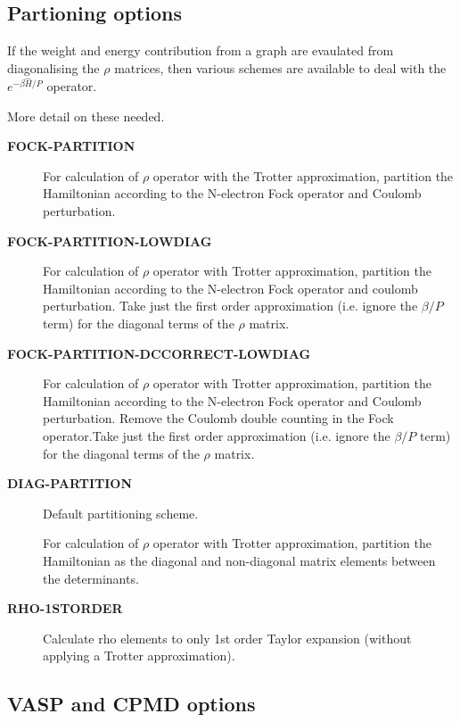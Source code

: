 \documentclass[openany,a4paper,10pt]{manual}
\begin{document}
\subsection{Partioning options}

If the weight and energy contribution from a graph are evaulated from
diagonalising the $\rho$ matrices, then various schemes are
available to deal with the $e^{-\beta\hat{H}/P}$ operator.

\begin{notice}[note]
More detail on these needed.
\end{notice}
\begin{description}
\item[\textbf{FOCK-PARTITION}]
For calculation of $\rho$ operator with the Trotter
approximation, partition the Hamiltonian according to the N-electron
Fock operator and Coulomb perturbation.

\item[\textbf{FOCK-PARTITION-LOWDIAG}]
For calculation of $\rho$ operator with Trotter approximation,
partition the Hamiltonian according to the N-electron Fock operator
and coulomb perturbation.  Take just the first order approximation
(i.e. ignore the $\beta/P$ term) for the diagonal terms of the
$\rho$ matrix.

\item[\textbf{FOCK-PARTITION-DCCORRECT-LOWDIAG}]
For calculation of $\rho$ operator with Trotter approximation,
partition the Hamiltonian according to the N-electron Fock operator
and Coulomb perturbation.  Remove the Coulomb double counting in the
Fock operator.Take just the first order approximation (i.e. ignore
the $\beta/P$ term) for the diagonal terms of the $\rho$
matrix.

\item[\textbf{DIAG-PARTITION}]
Default partitioning scheme.

For calculation of $\rho$ operator with Trotter approximation,
partition the Hamiltonian as the diagonal and non-diagonal matrix
elements between the determinants.

\item[\textbf{RHO-1STORDER}]
Calculate rho elements to only 1st order Taylor expansion (without
applying a Trotter approximation).

\end{description}


\subsection{VASP and CPMD options}
\end{document}
